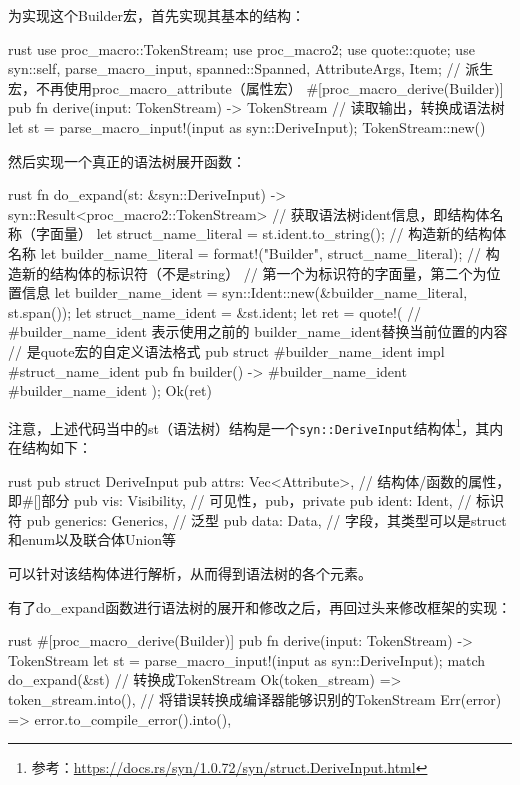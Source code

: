 为实现这个Builder宏，首先实现其基本的结构：
\begin{code-block}{rust}
use proc_macro::TokenStream;
use proc_macro2;
use quote::quote;
use syn::{self, parse_macro_input, spanned::Spanned, AttributeArgs, Item};
// 派生宏，不再使用proc_macro_attribute（属性宏）
#[proc_macro_derive(Builder)]
pub fn derive(input: TokenStream) -> TokenStream {
    // 读取输出，转换成语法树
    let st = parse_macro_input!(input as syn::DeriveInput);
    TokenStream::new()
}
\end{code-block}

然后实现一个真正的语法树展开函数：
\begin{code-block}{rust}
fn do_expand(st: &syn::DeriveInput) -> syn::Result<proc_macro2::TokenStream> {
    // 获取语法树ident信息，即结构体名称（字面量）
    let struct_name_literal = st.ident.to_string();
    // 构造新的结构体名称
    let builder_name_literal = format!("{}Builder", struct_name_literal);
    // 构造新的结构体的标识符（不是string）
    // 第一个为标识符的字面量，第二个为位置信息
    let builder_name_ident = syn::Ident::new(&builder_name_literal, st.span());
    let struct_name_ident = &st.ident;
    let ret = quote!(
        // #builder_name_ident 表示使用之前的 builder_name_ident替换当前位置的内容
        // 是quote宏的自定义语法格式
        pub struct #builder_name_ident {
        }
        impl #struct_name_ident {
            pub fn builder() -> #builder_name_ident {
                #builder_name_ident {
                }
            }
        }
    );
    Ok(ret)
}
\end{code-block}
注意，上述代码当中的st（语法树）结构是一个\texttt{syn::DeriveInput}结构体\footnote{参考：\url{https://docs.rs/syn/1.0.72/syn/struct.DeriveInput.html}}，其内在结构如下：
\begin{code-block}{rust}
pub struct DeriveInput {
    pub attrs: Vec<Attribute>, // 结构体/函数的属性，即#[]部分
    pub vis: Visibility,       // 可见性，pub，private
    pub ident: Ident,          // 标识符
    pub generics: Generics,    // 泛型
    pub data: Data,            // 字段，其类型可以是struct和enum以及联合体Union等
}
\end{code-block}
可以针对该结构体进行解析，从而得到语法树的各个元素。

有了do\_expand函数进行语法树的展开和修改之后，再回过头来修改框架的实现：
\begin{code-block}{rust}
#[proc_macro_derive(Builder)]
pub fn derive(input: TokenStream) -> TokenStream {
    let st = parse_macro_input!(input as syn::DeriveInput);
    match do_expand(&st) {
        // 转换成TokenStream
        Ok(token_stream) => token_stream.into(),
        // 将错误转换成编译器能够识别的TokenStream
        Err(error) => error.to_compile_error().into(),
    }
}
\end{code-block}

